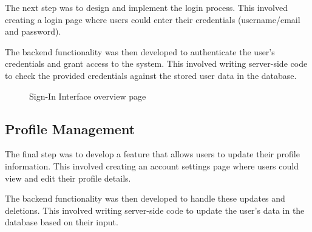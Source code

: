 The next step was to design and implement the login process. This involved creating a login page where users could enter their credentials (username/email and password).

The backend functionality was then developed to authenticate the user's credentials and grant access to the system. This involved writing server-side code to check the provided credentials against the stored user data in the database.

\begin{figure}[H]
    \centering
    \caption{ Sign-In Interface overview page}
    \label{fig:Sign-In-Interface-overview-page}
\end{figure}



\subsection{Profile Management}

The final step was to develop a feature that allows users to update their profile information. This involved creating an account settings page where users could view and edit their profile details.

The backend functionality was then developed to handle these updates and deletions. This involved writing server-side code to update the user's data in the database based on their input.


